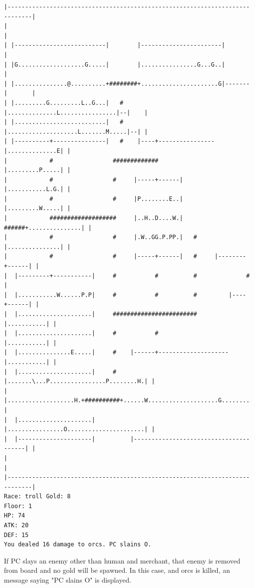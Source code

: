 \documentclass[11pt]{article}
\theoremstyle{plain}
\begin{document}
\begin{Verbatim}[fontsize=\scriptsize]
|-----------------------------------------------------------------------------|
|                                                                             |
| |--------------------------|        |-----------------------|               |
| |G...................G.....|        |................G...G..|               |
| |...............@..........+########+......................G|-------|       |
| |.........G.........L..G...|   #    |..............L................|--|    |
| |..........................|   #    |....................L.......M.....|--| |
| |----------+---------------|   #    |----+----------------|..............E| |
|            #                 #############                |.........P.....| |
|            #                 #     |-----+------|         |...........L.G.| |
|            #                 #     |P........E..|         |.........W.....| |
|            ###################     |..H..D....W.|   ######+...............| |
|            #                 #     |.W..GG.P.PP.|   #     |...............| |
|            #                 #     |-----+------|   #     |--------+------| |
|  |---------+-----------|     #           #          #              #        |
|  |...........W......P.P|     #           #          #         |----+------| |
|  |.....................|     ########################         |...........| |
|  |.....................|     #           #                    |...........| |
|  |...............E.....|     #    |------+--------------------|...........| |
|  |.....................|     #    |.......\...P................P........H.| |
|  |...................H.+##########+......W....................G...........| |
|  |.....................|          |................O......................| |
|  |---------------------|          |---------------------------------------| |
|                                                                             |
|-----------------------------------------------------------------------------|
Race: troll Gold: 8                                                    Floor: 1
HP: 74
ATK: 20
DEF: 15
You dealed 16 damage to orcs. PC slains O. 
\end{Verbatim}
If PC slays an enemy other than human and merchant, that enemy is removed
from board and no gold will be spawned. In this case, and orcs is 
killed, an message saying "PC slains O" is displayed.
\end{document}
